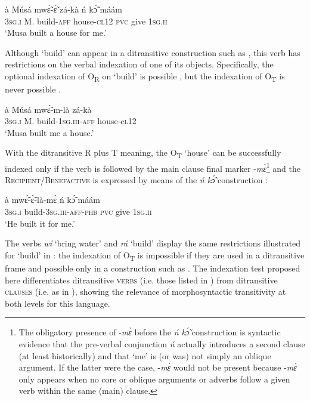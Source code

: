 \documentclass[output=paper]{langsci/langscibook}
\begin{document}
\ea
\label{ex:6.pacchiarotti}
\gll à    Músá  mwɛ̃́-ɛ̃̀    zá-kà    ń  kɔ̃́  máám \\
\textsc{3sg.i}    M.  build-\textsc{aff}  house\textsc{-cl12}  \textsc{pvc}  give  \textsc{1sg.ii}\\
\glt`Musa built a house for me.'
\z

Although `build' can appear in a ditransitive construction such as , this verb has restrictions on the verbal indexation of one of its objects. Specifically, the optional indexation of O\textsubscript{R} on `build' is possible , but the indexation of O\textsubscript{T} is never possible .

\ea
\label{ex:7.pacchiarotti}
\gll à    Músá  mwɛ̃́-m-là    zá-kà\\
\textsc{3sg.i}    M.  build-\textsc{1sg.iii-aff}  house-c\textsc{l12}\\
\glt `Musa built me a house.'
\z
 
\z


With the ditransitive R plus T meaning, the O\textsubscript{T} `house' can be successfully indexed only if the verb is followed by the main clause final marker -\textit{m\`{ɛ}}\footnote{The obligatory presence of -\textit{m\`{ɛ}} before the \textit{ń k\'{\~{ɔ}}} construction is syntactic evidence that the pre-verbal conjunction \textit{ń} actually introduces a second clause (at least historically) and that `me' is (or was) not simply an oblique argument. If the latter were the case, -\textit{m\`{ɛ}} would not be present because -\textit{m\`{ɛ}} only appears when no core or oblique arguments or adverbs follow a given verb within the same (main) clause.}{} and the \textsc{Recipient/Benefactive} is expressed by means of the \textit{ń k\'{\~{ɔ}}} construction :

\ea
\label{ex:9.pacchiarotti}
\gll à    mwɛ̃́-ɛ̃̀-là-mɛ̀      ń  kɔ̃́  máám \\
\textsc{3sg.i}    build-\textsc{3sg.iii-aff-phb}  \textsc{pvc}  give\textsc{  1sg.ii} \\
\glt `He built it for me.'
\z

The verbs \textit{wí} `bring water' and \textit{rá} `build' display the same restrictions illustrated for `build' in : the indexation of O\textsubscript{T} is impossible if they are used in a ditransitive frame and possible only in a construction such as . The indexation test proposed here differentiates ditransitive \textsc{verbs} (i.e. those listed in ) from ditransitive \textsc{clauses} (i.e. as in ), showing the relevance of morphosyntactic transitivity at both levels for this language.
\end{document}
